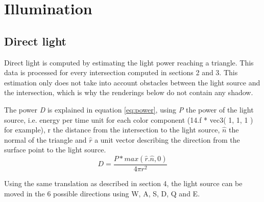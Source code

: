 \section{Illumination}
\subsection{Direct light}
Direct light is computed by estimating the light power reaching a triangle. This data is processed for every intersection computed in sections 2 and 3. This estimation only does not take into account obstacles between the light source and the intersection, which is why the renderings below do not contain any shadow.

The power \textit{D} is explained in equation \ref{eq:power}, using \textit{P} the power of the light source, i.e. energy per time unit for each color component (14.f * vec3( 1, 1, 1 ) for example), r the distance from the intersection to the light source, $\hat{n}$ the normal of the triangle and $\hat{r}$ a unit vector describing the direction from the surface point to the light source.
\begin{equation}
\label{eq:power}
D = \frac{P * max(\hat{r} . \hat{n}, 0)}{4 \pi r^2}
\end{equation}

Using the same translation as described in section 4, the light source can be moved in the 6 possible directions using W, A, S, D, Q and E.

